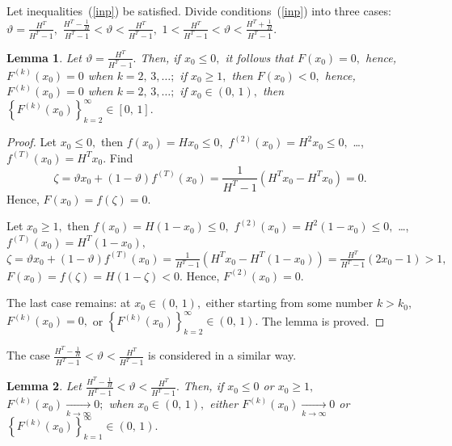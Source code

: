 \documentclass[12pt,a4paper]{amsart}
\newtheorem{lemma}{Lemma}
\begin{document}
Let inequalities~(\ref{inp}) be satisfied. Divide conditions~(\ref{inp}) into three cases: $\vartheta=\frac{H^T}{H^T-1},$
$\frac{H^T-\frac{1}{H}}{H^T-1}<\vartheta<\frac{H^T}{H^T-1},$ $1<\frac{H^T}{H^T-1}<\vartheta<\frac{H^T+\frac{1}{H}}{H^T-1}.$

\begin{lemma}\label{l2}
Let $\vartheta=\frac{H^T}{H^T-1}.$ Then, if $x_0\leq 0,$ it follows that $F(x_0)=0,$ hence, $F^{(k)}(x_0)=0$ when $k=2,\,3,\ldots;$
if $x_0\geq 1,$ then $F(x_0)<0,$ hence, $F^{(k)}(x_0)=0$ when $k=2,\,3,\ldots;$ if $x_0\in(0,\,1),$ then 
$\left\{F^{(k)}(x_0)\right\}_{k=2}^{\infty}\in[0,\,1].$  
\end{lemma}

\begin{proof}
Let $x_0\leq 0,$ then $f(x_0)=Hx_0\leq 0,$ $f^{(2)}(x_0)=H^2 x_0\leq 0,$ \ldots, $f^{(T)}(x_0)=H^T x_0.$  Find 
$$
\zeta=\vartheta x_0 + (1-\vartheta)f^{(T)}(x_0)=\frac{1}{H^T-1}\left(H^T x_0 - H^T x_0\right)=0.
$$ 
Hence, $F(x_0)=f(\zeta)=0.$

Let $x_0\geq 1,$ then $f(x_0)=H (1-x_0)\leq 0,$ $f^{(2)}(x_0)=H^2 (1-x_0)\leq 0,$ \ldots, $f^{(T)}(x_0)=H^T (1-x_0),$
$\zeta=\vartheta x_0 + (1-\vartheta)f^{(T)}(x_0)=\frac{1}{H^T-1}\left(H^T x_0 - H^T (1-x_0)\right)=\frac{H^T}{H^T-1}(2x_0-1)>1,$
$F(x_0)=f(\zeta)=H(1-\zeta)<0.$ Hence, $F^{(2)}(x_0)=0.$ 

The last case remains: at $x_0\in(0,\,1),$ either starting from some number $k>k_0,$  $F^{(k)}(x_0)=0,$ or 
$\left\{F^{(k)}(x_0)\right\}_{k=2}^{\infty}\in(0,\,1).$ The lemma is proved.
\end{proof}

The case $\frac{H^T-\frac{1}{H}}{H^T-1}<\vartheta<\frac{H^T}{H^T-1}$ is considered in a similar way.

\begin{lemma}\label{l3}
Let $\frac{H^T-\frac{1}{H}}{H^T-1}<\vartheta<\frac{H^T}{H^T-1}.$ Then, if $x_0\leq 0$ or $x_0\geq 1,$ 
${F^{(k)}(x_0)\xrightarrow[k\rightarrow\infty]{}0;}$ when $x_0\in(0,\,1),$ either $F^{(k)}(x_0)\xrightarrow[k\rightarrow\infty]{}0$
or $\left\{F^{(k)}(x_0)\right\}_{k=1}^{\infty}\in(0,\,1).$
\end{lemma}
\end{document}
